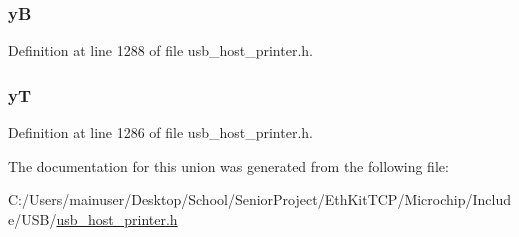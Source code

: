 \subsubsection[{y\+B}]{ y\+B}\label{union_u_s_b___p_r_i_n_t_e_r___g_r_a_p_h_i_c_s___p_a_r_a_m_e_t_e_r_s_a75f3fc106ada28aab0c4a192326006c8}


Definition at line 1288 of file usb\+\_\+host\+\_\+printer.\+h.

\hypertarget{union_u_s_b___p_r_i_n_t_e_r___g_r_a_p_h_i_c_s___p_a_r_a_m_e_t_e_r_s_a949864b828dc476d6108029a6586084d}{}
\subsubsection[{y\+T}]{ y\+T}\label{union_u_s_b___p_r_i_n_t_e_r___g_r_a_p_h_i_c_s___p_a_r_a_m_e_t_e_r_s_a949864b828dc476d6108029a6586084d}


Definition at line 1286 of file usb\+\_\+host\+\_\+printer.\+h.



The documentation for this union was generated from the following file\+:\begin{DoxyCompactItemize}
\item 
C\+:/\+Users/mainuser/\+Desktop/\+School/\+Senior\+Project/\+Eth\+Kit\+T\+C\+P/\+Microchip/\+Include/\+U\+S\+B/\hyperlink{usb__host__printer_8h}{usb\+\_\+host\+\_\+printer.\+h}\end{DoxyCompactItemize}
